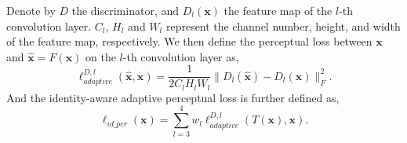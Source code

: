 \documentclass[journal]{IEEEtran}
\begin{document}
Denote by $D$ the discriminator, and $D_l(\mathbf{x})$ the feature map of the $l$-th convolution layer.
$C_l$, $H_l$ and $W_l$ represent the channel number, height, and width of the feature map, respectively.
We then define the perceptual loss between $\mathbf{x}$ and $\hat{\mathbf{x}} = F(\mathbf{x})$ on the $l$-th convolution layer as,
\begin{equation}\label{eq10}
 \ell_{adaptive}^{D,l}(\hat{\mathbf{x}}, \mathbf{x}) = \frac{1}{2C_lH_lW_l}\|D_l(\hat{\mathbf{x}})-D_l(\mathbf{x})\|_F^2.
\end{equation}
And the identity-aware adaptive perceptual loss is further defined as,
\begin{equation}\label{eq11}
  \ell_{id\_{per}}(\mathbf{x}) = \sum_{l=3}^4 w_l\ell_{adaptive}^{D,l}(T(\mathbf{x}), \mathbf{x}).
\end{equation}
\end{document}
